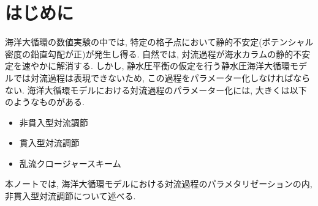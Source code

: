\section{はじめに}
海洋大循環の数値実験の中では, 特定の格子点において静的不安定(ポテンシャル密度の鉛直勾配が正)が発生し得る.
自然では, 対流過程が海水カラムの静的不安定を速やかに解消する. 
しかし, 静水圧平衡の仮定を行う静水圧海洋大循環モデルでは対流過程は表現できないため,
この過程をパラメーター化しなければならない.
海洋大循環モデルにおける対流過程のパラメーター化には, 大きくは以下のようなものがある.
\begin{itemize}
 \item 非貫入型対流調節
 \item 貫入型対流調節
 \item 乱流クロージャースキーム      
\end{itemize}
本ノートでは, 海洋大循環モデルにおける対流過程のパラメタリゼーションの内,
非貫入型対流調節について述べる.

